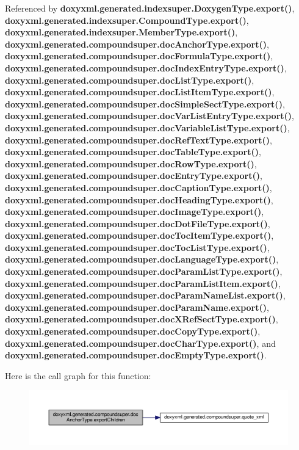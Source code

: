 Referenced by {\bf doxyxml.\+generated.\+indexsuper.\+Doxygen\+Type.\+export()}, {\bf doxyxml.\+generated.\+indexsuper.\+Compound\+Type.\+export()}, {\bf doxyxml.\+generated.\+indexsuper.\+Member\+Type.\+export()}, {\bf doxyxml.\+generated.\+compoundsuper.\+doc\+Anchor\+Type.\+export()}, {\bf doxyxml.\+generated.\+compoundsuper.\+doc\+Formula\+Type.\+export()}, {\bf doxyxml.\+generated.\+compoundsuper.\+doc\+Index\+Entry\+Type.\+export()}, {\bf doxyxml.\+generated.\+compoundsuper.\+doc\+List\+Type.\+export()}, {\bf doxyxml.\+generated.\+compoundsuper.\+doc\+List\+Item\+Type.\+export()}, {\bf doxyxml.\+generated.\+compoundsuper.\+doc\+Simple\+Sect\+Type.\+export()}, {\bf doxyxml.\+generated.\+compoundsuper.\+doc\+Var\+List\+Entry\+Type.\+export()}, {\bf doxyxml.\+generated.\+compoundsuper.\+doc\+Variable\+List\+Type.\+export()}, {\bf doxyxml.\+generated.\+compoundsuper.\+doc\+Ref\+Text\+Type.\+export()}, {\bf doxyxml.\+generated.\+compoundsuper.\+doc\+Table\+Type.\+export()}, {\bf doxyxml.\+generated.\+compoundsuper.\+doc\+Row\+Type.\+export()}, {\bf doxyxml.\+generated.\+compoundsuper.\+doc\+Entry\+Type.\+export()}, {\bf doxyxml.\+generated.\+compoundsuper.\+doc\+Caption\+Type.\+export()}, {\bf doxyxml.\+generated.\+compoundsuper.\+doc\+Heading\+Type.\+export()}, {\bf doxyxml.\+generated.\+compoundsuper.\+doc\+Image\+Type.\+export()}, {\bf doxyxml.\+generated.\+compoundsuper.\+doc\+Dot\+File\+Type.\+export()}, {\bf doxyxml.\+generated.\+compoundsuper.\+doc\+Toc\+Item\+Type.\+export()}, {\bf doxyxml.\+generated.\+compoundsuper.\+doc\+Toc\+List\+Type.\+export()}, {\bf doxyxml.\+generated.\+compoundsuper.\+doc\+Language\+Type.\+export()}, {\bf doxyxml.\+generated.\+compoundsuper.\+doc\+Param\+List\+Type.\+export()}, {\bf doxyxml.\+generated.\+compoundsuper.\+doc\+Param\+List\+Item.\+export()}, {\bf doxyxml.\+generated.\+compoundsuper.\+doc\+Param\+Name\+List.\+export()}, {\bf doxyxml.\+generated.\+compoundsuper.\+doc\+Param\+Name.\+export()}, {\bf doxyxml.\+generated.\+compoundsuper.\+doc\+X\+Ref\+Sect\+Type.\+export()}, {\bf doxyxml.\+generated.\+compoundsuper.\+doc\+Copy\+Type.\+export()}, {\bf doxyxml.\+generated.\+compoundsuper.\+doc\+Char\+Type.\+export()}, and {\bf doxyxml.\+generated.\+compoundsuper.\+doc\+Empty\+Type.\+export()}.



Here is the call graph for this function\+:
\nopagebreak
\begin{figure}[H]
\begin{center}
\leavevmode
\includegraphics[width=350pt]{db/df1/classdoxyxml_1_1generated_1_1compoundsuper_1_1docAnchorType_abc72d60db4b23cc49a66540a7d81e5de_cgraph}
\end{center}
\end{figure}




